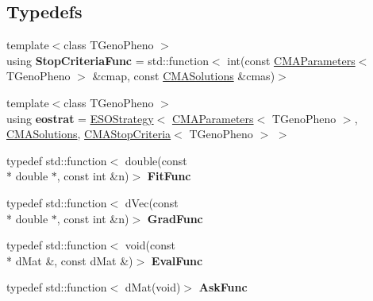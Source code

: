 \subsection*{Typedefs}
\begin{DoxyCompactItemize}
\item 
\hypertarget{namespacelibcmaes_a0ea49cc676992a7089a563279ca35df0}{{\footnotesize template$<$class T\-Geno\-Pheno $>$ }\\using {\bfseries Stop\-Criteria\-Func} = std\-::function$<$ int(const \hyperlink{classlibcmaes_1_1CMAParameters}{C\-M\-A\-Parameters}$<$ T\-Geno\-Pheno $>$ \&cmap, const \hyperlink{classlibcmaes_1_1CMASolutions}{C\-M\-A\-Solutions} \&cmas)$>$}\label{namespacelibcmaes_a0ea49cc676992a7089a563279ca35df0}

\item 
\hypertarget{namespacelibcmaes_a5d26dcaad08b23bcacac2631ba9f0f2c}{{\footnotesize template$<$class T\-Geno\-Pheno $>$ }\\using {\bfseries eostrat} = \hyperlink{classlibcmaes_1_1ESOStrategy}{E\-S\-O\-Strategy}$<$ \hyperlink{classlibcmaes_1_1CMAParameters}{C\-M\-A\-Parameters}$<$ T\-Geno\-Pheno $>$, \hyperlink{classlibcmaes_1_1CMASolutions}{C\-M\-A\-Solutions}, \hyperlink{classlibcmaes_1_1CMAStopCriteria}{C\-M\-A\-Stop\-Criteria}$<$ T\-Geno\-Pheno $>$ $>$}\label{namespacelibcmaes_a5d26dcaad08b23bcacac2631ba9f0f2c}

\item 
\hypertarget{namespacelibcmaes_aaa4766cb6addd3ad397456a779436854}{typedef std\-::function$<$ double(const \\*
double $\ast$, const int \&n)$>$ {\bfseries Fit\-Func}}\label{namespacelibcmaes_aaa4766cb6addd3ad397456a779436854}

\item 
\hypertarget{namespacelibcmaes_ae29f09cdf8b5322ac32dc9ccddecd9dd}{typedef std\-::function$<$ d\-Vec(const \\*
double $\ast$, const int \&n)$>$ {\bfseries Grad\-Func}}\label{namespacelibcmaes_ae29f09cdf8b5322ac32dc9ccddecd9dd}

\item 
\hypertarget{namespacelibcmaes_aa2265af293af05f3bb2015aa9a4d3bb5}{typedef std\-::function$<$ void(const \\*
d\-Mat \&, const d\-Mat \&)$>$ {\bfseries Eval\-Func}}\label{namespacelibcmaes_aa2265af293af05f3bb2015aa9a4d3bb5}

\item 
\hypertarget{namespacelibcmaes_a97fc2a1efe35f5985451a770507c991f}{typedef std\-::function$<$ d\-Mat(void)$>$ {\bfseries Ask\-Func}}\label{namespacelibcmaes_a97fc2a1efe35f5985451a770507c991f}


\end{DoxyCompactItemize}
